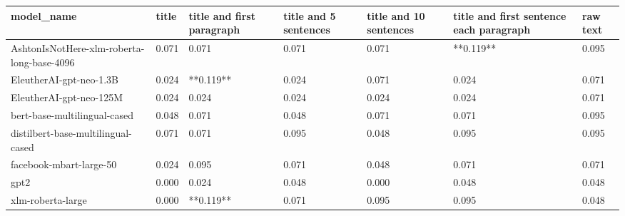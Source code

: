 \begin{tabular}{lllllll}
\toprule
                                model\_name & title & title and first paragraph & title and 5 sentences & title and 10 sentences & title and first sentence each paragraph & raw text \\
\midrule
AshtonIsNotHere-xlm-roberta-long-base-4096 & 0.071 &                     0.071 &                 0.071 &                  0.071 &                               **0.119** &    0.095 \\
                   EleutherAI-gpt-neo-1.3B & 0.024 &                 **0.119** &                 0.024 &                  0.071 &                                   0.024 &    0.071 \\
                   EleutherAI-gpt-neo-125M & 0.024 &                     0.024 &                 0.024 &                  0.024 &                                   0.024 &    0.071 \\
              bert-base-multilingual-cased & 0.048 &                     0.071 &                 0.048 &                  0.071 &                                   0.071 &    0.095 \\
        distilbert-base-multilingual-cased & 0.071 &                     0.071 &                 0.095 &                  0.048 &                                   0.095 &    0.095 \\
                   facebook-mbart-large-50 & 0.024 &                     0.095 &                 0.071 &                  0.048 &                                   0.071 &    0.071 \\
                                      gpt2 & 0.000 &                     0.024 &                 0.048 &                  0.000 &                                   0.048 &    0.048 \\
                         xlm-roberta-large & 0.000 &                 **0.119** &                 0.071 &                  0.095 &                                   0.095 &    0.048 \\
\bottomrule
\end{tabular}
